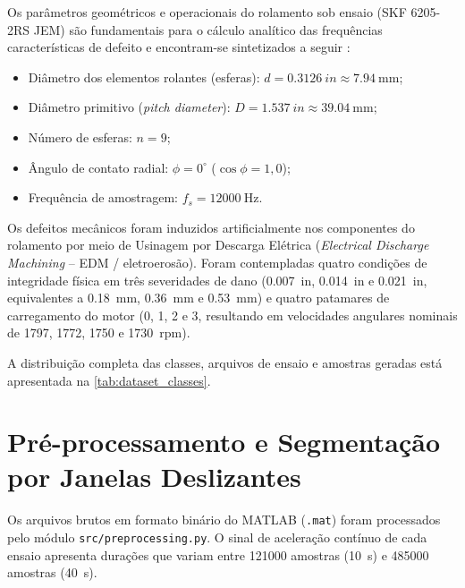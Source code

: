 Os parâmetros geométricos e operacionais do rolamento sob ensaio (SKF 6205-2RS JEM) são fundamentais para o cálculo analítico das frequências características de defeito e encontram-se sintetizados a seguir \cite{smith2015rolling}:
\begin{itemize}
    \item Diâmetro dos elementos rolantes (esferas): $d = \SI{0.3126}{in} \approx \SI{7,94}{\milli\meter}$;
    \item Diâmetro primitivo (\textit{pitch diameter}): $D = \SI{1.537}{in} \approx \SI{39,04}{\milli\meter}$;
    \item Número de esferas: $n = 9$;
    \item Ângulo de contato radial: $\phi = 0^\circ$ ($\cos\phi = 1,0$);
    \item Frequência de amostragem: $f_s = \SI{12000}{\hertz}$.
\end{itemize}

Os defeitos mecânicos foram induzidos artificialmente nos componentes do rolamento por meio de Usinagem por Descarga Elétrica (\textit{Electrical Discharge Machining} -- EDM / eletroerosão). Foram contempladas quatro condições de integridade física em três severidades de dano (\SI{0.007}{in}, \SI{0.014}{in} e \SI{0.021}{in}, equivalentes a \SI{0,18}{\milli\meter}, \SI{0,36}{\milli\meter} e \SI{0,53}{\milli\meter}) e quatro patamares de carregamento do motor (0, 1, 2 e \SI{3}{\horsepower}, resultando em velocidades angulares nominais de 1797, 1772, 1750 e \SI{1730}{rpm}).

A distribuição completa das classes, arquivos de ensaio e amostras geradas está apresentada na \autoref{tab:dataset_classes}.



\section{Pré-processamento e Segmentação por Janelas Deslizantes}
\label{sec:segmentacao}

Os arquivos brutos em formato binário do MATLAB (\texttt{.mat}) foram processados pelo módulo \texttt{src/preprocessing.py}. O sinal de aceleração contínuo de cada ensaio apresenta durações que variam entre \num{121000} amostras (\SI{10}{\second}) e \num{485000} amostras (\SI{40}{\second}).

